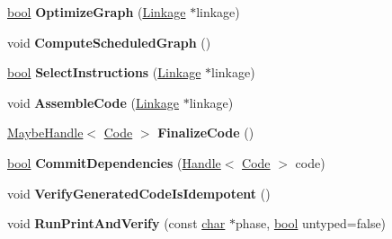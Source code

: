 \begin{DoxyCompactItemize}
\mbox{\hyperlink{classbool}{bool}} {\bfseries Optimize\+Graph} (\mbox{\hyperlink{classv8_1_1internal_1_1compiler_1_1Linkage}{Linkage}} $\ast$linkage)
\item 
\mbox{\label{classv8_1_1internal_1_1compiler_1_1PipelineImpl_a2252cadc496ed9970b2a289fc91a81c6}} 
void {\bfseries Compute\+Scheduled\+Graph} ()
\item 
\mbox{\label{classv8_1_1internal_1_1compiler_1_1PipelineImpl_a10fb3c6343d45066d6e0809c58f1e7e6}} 
\mbox{\hyperlink{classbool}{bool}} {\bfseries Select\+Instructions} (\mbox{\hyperlink{classv8_1_1internal_1_1compiler_1_1Linkage}{Linkage}} $\ast$linkage)
\item 
\mbox{\label{classv8_1_1internal_1_1compiler_1_1PipelineImpl_a176da1a2046cd1895a341d60a104e557}} 
void {\bfseries Assemble\+Code} (\mbox{\hyperlink{classv8_1_1internal_1_1compiler_1_1Linkage}{Linkage}} $\ast$linkage)
\item 
\mbox{\label{classv8_1_1internal_1_1compiler_1_1PipelineImpl_a79500c0f1ec087d5a066600fc068f7c8}} 
\mbox{\hyperlink{classv8_1_1internal_1_1MaybeHandle}{Maybe\+Handle}}$<$ \mbox{\hyperlink{classv8_1_1internal_1_1Code}{Code}} $>$ {\bfseries Finalize\+Code} ()
\item 
\mbox{\label{classv8_1_1internal_1_1compiler_1_1PipelineImpl_ac49a7ba7b8ed7d6f5f37dd39592e5f73}} 
\mbox{\hyperlink{classbool}{bool}} {\bfseries Commit\+Dependencies} (\mbox{\hyperlink{classv8_1_1internal_1_1Handle}{Handle}}$<$ \mbox{\hyperlink{classv8_1_1internal_1_1Code}{Code}} $>$ code)
\item 
\mbox{\label{classv8_1_1internal_1_1compiler_1_1PipelineImpl_a31436bb554500a44fbe5196d1d7817a6}} 
void {\bfseries Verify\+Generated\+Code\+Is\+Idempotent} ()
\item 
\mbox{\label{classv8_1_1internal_1_1compiler_1_1PipelineImpl_a5902a52f83068f881b63cd17a20bea5d}} 
void {\bfseries Run\+Print\+And\+Verify} (const \mbox{\hyperlink{classchar}{char}} $\ast$phase, \mbox{\hyperlink{classbool}{bool}} untyped=false)

\end{DoxyCompactItemize}

